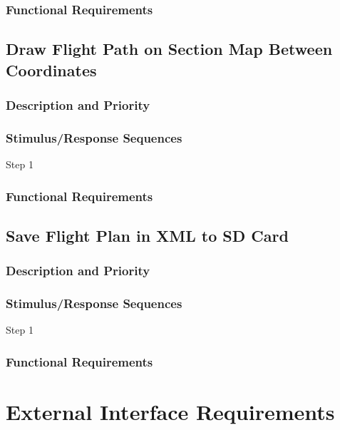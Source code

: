 \documentclass[12pt, letterpaper]{article}
\begin{document}
      \subsubsection{Functional Requirements}

      \subsection{Draw Flight Path on Section Map Between Coordinates}
        \subsubsection{Description and Priority}
        \subsubsection{Stimulus/Response Sequences}
          \begin{description}
            \item[Step 1]
          \end{description}
        \subsubsection{Functional Requirements}

        \subsection{Save Flight Plan in XML to SD Card}
          \subsubsection{Description and Priority}
          \subsubsection{Stimulus/Response Sequences}
            \begin{description}
              \item[Step 1]
            \end{description}
          \subsubsection{Functional Requirements}

\section{External Interface Requirements}
\end{document}
